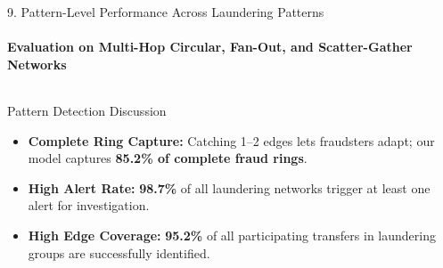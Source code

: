 \documentclass[aspectratio=169, 11pt]{beamer}
\begin{document}
\begin{frame}{9. Pattern-Level Performance Across Laundering Patterns}
    \framesubtitle{Evaluation on Multi-Hop Circular, Fan-Out, and Scatter-Gather Networks}
    \vspace{-0.3cm}
    \begin{columns}[T]
        \centering
        \vspace{0.12cm}

        \begin{block}{Pattern Detection Discussion}
            \scriptsize
            \begin{itemize}\setlength{\itemsep}{1.5pt}\setlength{\parskip}{0pt}
                \item \textbf{Complete Ring Capture:} Catching 1--2 edges lets fraudsters adapt; our model captures \textbf{85.2\% of complete fraud rings}.
                \item \textbf{High Alert Rate:} \textbf{98.7\%} of all laundering networks trigger at least one alert for investigation.
                \item \textbf{High Edge Coverage:} \textbf{95.2\%} of all participating transfers in laundering groups are successfully identified.
            \end{itemize}
        \end{block}
    \end{columns}
\end{frame}
\end{document}
